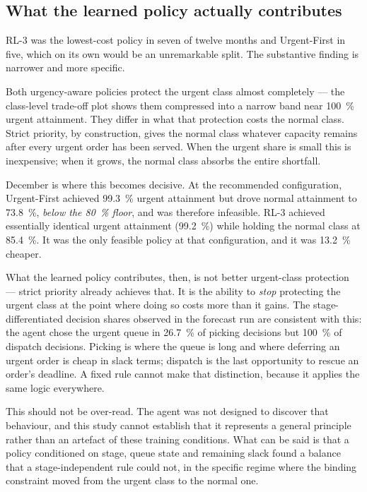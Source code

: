 \subsection{What the learned policy actually contributes}

RL-3 was the lowest-cost policy in seven of twelve months and Urgent-First in five, which on
its own would be an unremarkable split. The substantive finding is narrower and more specific.

Both urgency-aware policies protect the urgent class almost completely --- the class-level
trade-off plot shows them compressed into a narrow band near \SI{100}{\percent} urgent
attainment. They differ in what that protection costs the normal class. Strict priority, by
construction, gives the normal class whatever capacity remains after every urgent order has been
served. When the urgent share is small this is inexpensive; when it grows, the normal class
absorbs the entire shortfall.

December is where this becomes decisive. At the recommended configuration, Urgent-First achieved
\SI{99.3}{\percent} urgent attainment but drove normal attainment to \SI{73.8}{\percent},
\emph{below the \SI{80}{\percent} floor}, and was therefore infeasible. RL-3 achieved
essentially identical urgent attainment (\SI{99.2}{\percent}) while holding the normal class at
\SI{85.4}{\percent}. It was the only feasible policy at that configuration, and it was
\SI{13.2}{\percent} cheaper.

What the learned policy contributes, then, is not better urgent-class protection --- strict
priority already achieves that. It is the ability to \emph{stop} protecting the urgent class at
the point where doing so costs more than it gains. The stage-differentiated decision shares
observed in the forecast run are consistent with this: the agent chose the urgent queue in
\SI{26.7}{\percent} of picking decisions but \SI{100}{\percent} of dispatch decisions. Picking
is where the queue is long and where deferring an urgent order is cheap in slack terms; dispatch
is the last opportunity to rescue an order's deadline. A fixed rule cannot make that
distinction, because it applies the same logic everywhere.

This should not be over-read. The agent was not designed to discover that behaviour, and this
study cannot establish that it represents a general principle rather than an artefact of these
training conditions. What can be said is that a policy conditioned on stage, queue state and
remaining slack found a balance that a stage-independent rule could not, in the specific regime
where the binding constraint moved from the urgent class to the normal one.

